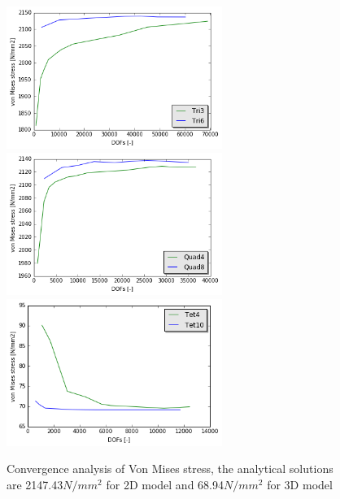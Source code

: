 \begin{figure}[htbp]
	\begin{center}	
		\includegraphics[width=7cm,clip]{triCon.png} 
		\includegraphics[width=7cm,clip]{quadCon.png} 	
        \includegraphics[width=7cm,clip]{tetCon.png} 			
		\caption{Convergence analysis of Von Mises stress, the analytical solutions are 2147.43$N/mm^2$ for 2D model and 68.94$N/mm^2$ for 3D model} \label{fig: ConPlot}
	\end{center}
\end{figure}


